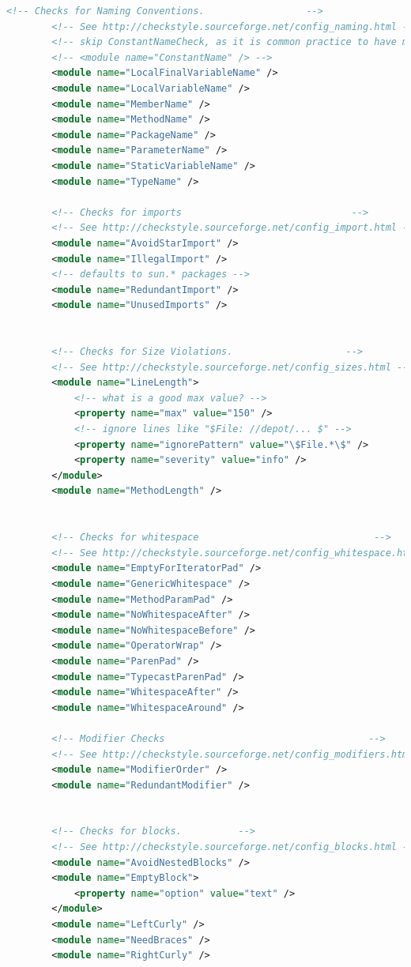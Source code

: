\begin{lstlisting}[language=XML]
        <!-- Checks for Naming Conventions.                  -->
        <!-- See http://checkstyle.sourceforge.net/config_naming.html -->
        <!-- skip ConstantNameCheck, as it is common practice to have mutable static variables in Android -->
        <!-- <module name="ConstantName" /> -->
        <module name="LocalFinalVariableName" />
        <module name="LocalVariableName" />
        <module name="MemberName" />
        <module name="MethodName" />
        <module name="PackageName" />
        <module name="ParameterName" />
        <module name="StaticVariableName" />
        <module name="TypeName" />

        <!-- Checks for imports                              -->
        <!-- See http://checkstyle.sourceforge.net/config_import.html -->
        <module name="AvoidStarImport" />
        <module name="IllegalImport" />
        <!-- defaults to sun.* packages -->
        <module name="RedundantImport" />
        <module name="UnusedImports" />


        <!-- Checks for Size Violations.                    -->
        <!-- See http://checkstyle.sourceforge.net/config_sizes.html -->
        <module name="LineLength">
            <!-- what is a good max value? -->
            <property name="max" value="150" />
            <!-- ignore lines like "$File: //depot/... $" -->
            <property name="ignorePattern" value="\$File.*\$" />
            <property name="severity" value="info" />
        </module>
        <module name="MethodLength" />


        <!-- Checks for whitespace                               -->
        <!-- See http://checkstyle.sourceforge.net/config_whitespace.html -->
        <module name="EmptyForIteratorPad" />
        <module name="GenericWhitespace" />
        <module name="MethodParamPad" />
        <module name="NoWhitespaceAfter" />
        <module name="NoWhitespaceBefore" />
        <module name="OperatorWrap" />
        <module name="ParenPad" />
        <module name="TypecastParenPad" />
        <module name="WhitespaceAfter" />
        <module name="WhitespaceAround" />

        <!-- Modifier Checks                                    -->
        <!-- See http://checkstyle.sourceforge.net/config_modifiers.html -->
        <module name="ModifierOrder" />
        <module name="RedundantModifier" />


        <!-- Checks for blocks.          -->
        <!-- See http://checkstyle.sourceforge.net/config_blocks.html -->
        <module name="AvoidNestedBlocks" />
        <module name="EmptyBlock">
            <property name="option" value="text" />
        </module>
        <module name="LeftCurly" />
        <module name="NeedBraces" />
        <module name="RightCurly" />



\end{lstlisting}
